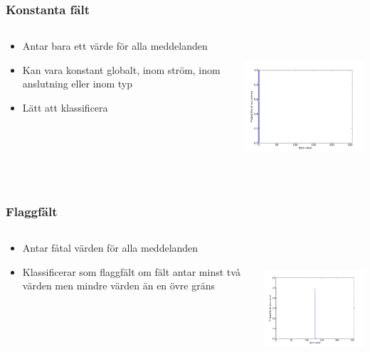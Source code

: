 \documentclass[xetex]{beamer}
\begin{document}

    \begin{frame}
        \frametitle{Konstanta fält}
        \begin{columns}[t]
            \begin{column}[T]{6cm}
                \begin{itemize}
                    \item Antar bara ett värde för alla meddelanden
                    \item Kan vara konstant globalt, inom ström, inom
                        anslutning eller inom typ
                    \item Lätt att klassificera
                \end{itemize}
            \end{column}
            \begin{column}[T]{6cm}
                \includegraphics[height=5cm]{img/const_one.pdf}
            \end{column}
        \end{columns}
    \end{frame}
    \begin{frame}
        \frametitle{Flaggfält}
        \begin{columns}[t]
            \begin{column}[T]{6cm}
                \begin{itemize}
                    \item Antar fåtal värden för alla meddelanden
                    \item Klassificerar som flaggfält om fält antar minst
                        två värden men mindre värden än en övre gräns
                \end{itemize}
            \end{column}
            \begin{column}[T]{6cm}
                \includegraphics[height=5cm]{img/flag.pdf}
            \end{column}
        \end{columns}
    \end{frame}
\end{document}
